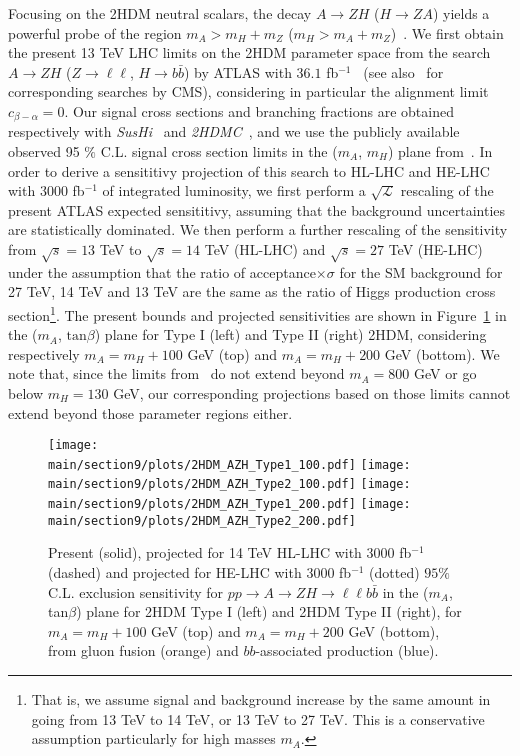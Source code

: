 Focusing on the 2HDM neutral scalars, the decay $A \to Z H$ ($H \to Z A$) yields a powerful probe of the 
region $m_A > m_H + m_Z$ ($m_H > m_A + m_Z$)~\cite{Coleppa:2014hxa,Dorsch:2014qja}. 
We first obtain the present 13 TeV LHC limits on the 2HDM parameter space from the 
search $A \to Z H$ ($Z\to \ell\ell$, $H \to b\bar{b}$) by ATLAS with $36.1$ fb$^{-1}$~\cite{Aaboud:2018eoy} (see also~\cite{Khachatryan:2016are,CMS:2016qxc} for 
corresponding searches by CMS), considering in particular the alignment limit $c_{\beta -\alpha} = 0$.
Our signal cross sections and branching fractions are obtained 
respectively with {\sl SusHi}~\cite{Harlander:2012pb} and {\sl 2HDMC}~\cite{Eriksson:2009ws}, and we use the 
publicly available observed 95 $\%$ C.L. signal cross section limits in the ($m_A$, $m_H$) plane from~\cite{Aaboud:2018eoy}.   
In order to derive a sensititivy projection of this search to HL-LHC and HE-LHC with 
$3000$ fb$^{-1}$ of integrated luminosity, we first perform a $\sqrt{\mathcal{L}}$ rescaling of the present ATLAS expected 
sensititivy, assuming that the background uncertainties are statistically dominated.
We then perform a further rescaling of the sensitivity from $\sqrt{s} = 13$ TeV to 
$\sqrt{s} = 14$ TeV (HL-LHC) and $\sqrt{s} = 27$ TeV (HE-LHC) under the assumption that the
ratio of acceptance$\times \sigma$ for the SM background for 27 TeV, 14 TeV and 13 TeV are the
same as the ratio of Higgs production cross section\footnote{That is, we assume signal and background increase by the same amount in going from 
13 TeV to 14 TeV, or 13 TeV to 27 TeV. This is a conservative assumption particularly for high masses $m_A$.}. 
The present bounds and projected sensitivities are shown in Figure~\ref{AZH_HL-LHC} in the 
($m_A$, $\mathrm{tan}\beta$) plane for Type I (left) and Type II (right) 2HDM, 
considering respectively $m_A = m_H + 100$ GeV (top) and $m_A = m_H + 200$ GeV (bottom).
We note that, since the limits from~\cite{Aaboud:2018eoy} do not extend beyond 
$m_A = 800$ GeV or go below $m_H = 130$ GeV, our corresponding projections based on those limits cannot 
extend beyond those parameter regions either. 
 

\begin{figure}[h]
\begin{center}
\texttt{[image: \\main/section9/plots/2HDM\_AZH\_Type1\_100.pdf]}
\texttt{[image: \\main/section9/plots/2HDM\_AZH\_Type2\_100.pdf]}
\texttt{[image: \\main/section9/plots/2HDM\_AZH\_Type1\_200.pdf]}
\texttt{[image: \\main/section9/plots/2HDM\_AZH\_Type2\_200.pdf]}
\caption{\small Present (solid), projected for 14 TeV HL-LHC with $3000$ fb$^{-1}$ (dashed) and projected for HE-LHC with $3000$ fb$^{-1}$ (dotted)
$95\%$ C.L. exclusion sensitivity for $p p \to A \to Z H \to \ell\ell b \bar{b}$  
in the ($m_{A}$, tan$\beta$) plane for 2HDM Type I (left) and 2HDM Type II (right), for $m_A = m_H +100$ GeV (top) and 
$m_A = m_H +200$ GeV (bottom), from 
gluon fusion (orange) and $bb$-associated production (blue).}
\label{AZH_HL-LHC}
\end{center}
\end{figure}

